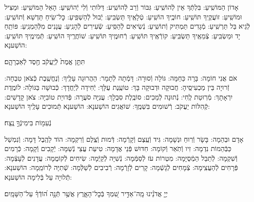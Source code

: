 \documentclass[twoside, openany, parskip=half, 11pt]{book}
\begin{document}

אָדוֹן הַמּוֹשִֽׁיעַ: בִּלְתְּֿךָ אֵין לְֿהוֹשִֽׁיעַ: גִּבּוֹר וְֿרַב לְֿהוֹשִֽׁיע: דַּלּוֹתִי וְֿלִי יְֿהוֹשִֽׁיעַ: הָאֵל הַמּוֹשִֽׁיעַ: וּמַצִּיל וּמוֹשִֽׁיעַ: זוֹעֲקֶֽיךָ תּוֹשִֽׁיעַ: חוֹכֶֽיךָ הוֹשִֽׁיעַ: טְֿלָאֶֽיךָ תַּשְׂבִּֽיעַ: יְֿבוּל לְֿהַשְׁפִּֽיעַ: כׇּל־שִֽׂיחַ תַּדְשֵׁא וְֿתוֹשִֽׁיעַ: לְֿגֵיא בַּל תַּרְשִֽׁיעַ: מְֿגָדִים תַּמְתִּיק וְֿתוֹשִֽׁיעַ: נְֿשִׂיאִים לְֿהַסִּֽיעַ: שְֿׂעִירִים לְֿהָנִֽיעַ: עֲנָנִים מִלְּֿהַמְנִֽיעַ: פּוֹתֵֽחַ יָד וּמַשְׂבִּֽיעַ: צְֿמֵאֶֽיךָ תַּשְׂבִּֽיעַ: קוֹרְֿאֶֽיךָ תּוֹשִֽׁיעַ: רְֿחוּמֶֽיךָ תּוֹשִֽׁיעַ:
שׁוֹחֲרֶֽיךָ הוֹשִֽׁיעַ:
תְּֿמִימֶֽיךָ תּוֹשִֽׁיעַ: הוֹשַׁענָא:

תִּתֵּ֤ן אֱמֶת֙ לְֿיַֽעֲקֹ֔ב חֶ֖סֶד לְֿאַבְרָהָ֑ם׃


אֹם אֲנִי חוֹמָה: בָּרָה כַּחַמָּה: גּוֹלָה וְֿסוּרָה: דָּמְֿתָה לְֿתָמָר: הַהֲרוּגָה עָלֶֽיךָ: וְֿנֶחֱשֶֽׁבֶת כְּֿצֹאן טִבְחָה: זְֿרוּיָה בֵּין מַכְעִיסֶֽיהָ: חֲבוּקָה וּדְבוּקָה בָּךְ: טוֹעֶֽנֶת עֻלָּךְ: יְֿחִידָה לְֿיַחֲדָךְ: כְּֿבוּשָׁה בַּגּוֹלָה: לוֹמֶֽדֶת יִרְאָתָךְ: מְֿרֽוּטַת לֶֽחִי: נְֿתוּנָה לְֿמַכִים: סוֹבֶֽלֶת סִבְלָךְ: עֲנִיָּה סֹעֲרָה: פְּֿדוּיַת טוֹבִיָּה: צֹאן קָדָשִׁים: קְֿהִלּוֹת יַעֲקֹב: רְֿשׁוּמִים בִּשְׁמֶֽךָ: שׁוֹאֲגִים הוֹשַׁענָא: הוֹשַׁענָא תְּֿמוּכִים עָלֶֽיךָ הוֹשַׁענָא:

נְֿעִמ֖וֹת בִּימִינְֿךָ֣ נֶֽצַח׃


אָדָם וּבְהֵמָה: בָּשָׂר וְֿרֽוּחַ וּנְשָׁמָה: גִּיד וְֿעֶֽצֶם וְֿקָרְֿמָה: דְּֿמוּת וְֿצֶֽלֶם וְֿרִקְמָה: הוֹד לַהֶֽבֶל דָּמָה: וְֿנִמְשַׁל כַּבְּֿהֵמוֹת נִדְמָה: זִיו וְֿתֹֽאַר וְֿקוֹמָה: חִדּוּשׁ פְּֿנֵי אֲדָמָה: טִיעַת עֲצֵי נְֿשַׁמָּה: יְֿקָבִים וְֿקָמָה: כְּֿרָמִים וְֿשִׁקְמָה: לְֿתֵבֵל הַמְֿסֻיָּמָה: מִטְרוֹת עֹז לְֿסַמְּֿמָה: נְֿשִׁיָּה לְֿקַיְּֿמָה: שִׂיחִים לְֿקוֹמֲמָה: עֲדָנִים לְֿעָצְֿמָה: פְּֿרָחִים לְֿהַעֲצִֽימָה: צְֿמָחִים לְֿגָשְֿׁמָה: קָרִים לְֿזָרְֿמָה: רְֿבִיבִים לְֿשַׁלְּֿמָה:
שְֿׁתִיָּה לְֿרוֹמֵֽמָה: הוֹשַׁענָא:
תְּֿלוּיָה עַל בְּֿלִימָה הוֹשַׁענָא:

יְיָ֤ אֲדֹנֵ֗ינוּ מָֽה־אַדִּ֣יר שִׁ֭מְךָ בְּֿכׇל־הָאָ֑רֶץ אֲשֶׁ֥ר תְּֿנָ֥ה ה֝וֹדְֿךָ֗ עַל־הַשָּׁמָֽיִם׃
\end{document}
